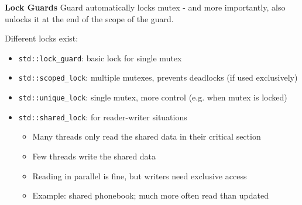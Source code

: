\vspace{-4pt}
\begin{sectionbox}
\textbf{Lock Guards}
Guard automatically locks mutex - and more importantly, also unlocks it at the end of the scope of the guard.

Different locks exist:
\begin{itemize}
    \item \lstinline{std::lock_guard}: basic lock for single mutex
    \item \lstinline{std::scoped_lock}: multiple mutexes, prevents deadlocks (if used exclusively)
    \item \lstinline{std::unique_lock}: single mutex, more control (e.g. when mutex is locked)
    \item \lstinline{std::shared_lock}: for reader-writer situations
    
    \begin{itemize}
        \item Many threads only read the shared data in their critical section
        \item Few threads write the shared data
        \item Reading in parallel is fine, but writers need exclusive access
        \item Example: shared phonebook; much more often read than updated
    \end{itemize}
\end{itemize}

\end{sectionbox}